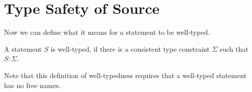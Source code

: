 \section{Type Safety of Source}
\label{simplsafe}

Now we can define what it means for a statement to be well-typed. 

\begin{definition}
A statement $S$ is
well-typed, if there is a consistent type constraint $\Sigma$ such that $S: \Sigma$.
\end{definition}

Note that this definition
of well-typedness requires that a well-typed statement has no free 
names.





